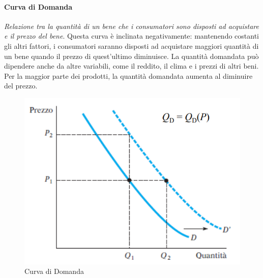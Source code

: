 \documentclass[12pt]{article}
\begin{document}
\paragraph{Curva di Domanda}
\textit{Relazione tra la quantità di un bene che i consumatori sono disposti ad acquistare e il prezzo del bene}. Questa curva è inclinata negativamente: mantenendo costanti gli altri fattori, i consumatori saranno disposti ad acquistare maggiori quantità di un bene quando il
prezzo di quest’ultimo diminuisce. La quantità domandata può dipendere anche da altre variabili, come il reddito, il clima e i prezzi di altri beni. Per la maggior parte dei prodotti, la quantità domandata aumenta al diminuire del prezzo.
\FloatBarrier
\begin{figure}[!htb]
    \centering
    \includegraphics[width=1\textwidth]{images/domanda.png}
    \caption{Curva di Domanda}
\end{figure}
\end{document}
